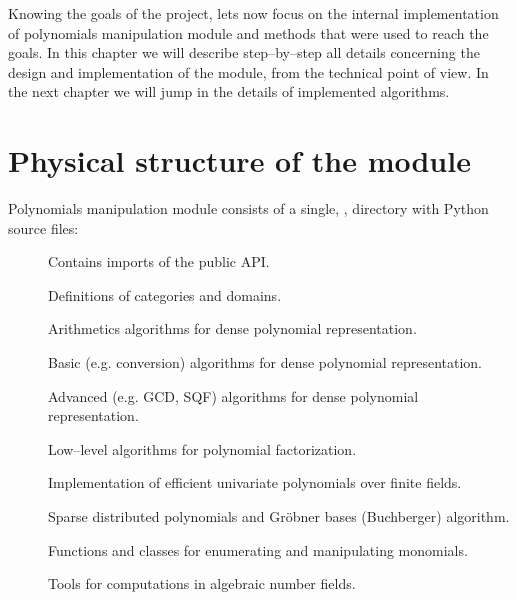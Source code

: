 Knowing the goals of the project, lets now focus on the internal implementation of polynomials
manipulation module and methods that were used to reach the goals. In this chapter we will describe
step--by--step all details concerning the design and implementation of the module, from the technical
point of view. In the next chapter we will jump in the details of implemented algorithms.


\section{Physical structure of the module}

Polynomials manipulation module consists of a single, ,  directory with Python source
files:
\begin{description}
\item[] \leavevmode
Contains imports of the public API.

\item[] \leavevmode
Definitions of categories and domains.

\item[] \leavevmode
Arithmetics algorithms for dense polynomial representation.

\item[] \leavevmode
Basic (e.g. conversion) algorithms for dense polynomial representation.

\item[] \leavevmode
Advanced (e.g. GCD, SQF) algorithms for dense polynomial representation.

\item[] \leavevmode
Low--level algorithms for polynomial factorization.

\item[] \leavevmode
Implementation of efficient univariate polynomials over finite fields.

\item[] \leavevmode
Sparse distributed polynomials and Gröbner bases (Buchberger) algorithm.

\item[] \leavevmode
Functions and classes for enumerating and manipulating monomials.

\item[] \leavevmode
Tools for computations in algebraic number fields.


\end{description}
